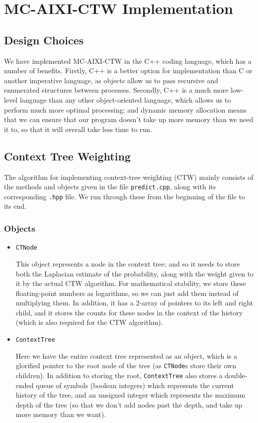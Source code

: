 \documentclass[pdftex,twoside,a4paper]{report}
\begin{document}
\chapter{MC-AIXI-CTW Implementation}
\section{Design Choices}

We have implemented MC-AIXI-CTW in the C++ coding language, which has a number of benefits. Firstly, C++ is a better option for implementation than C or another imperative language, as objects allow us to pass recursive and enumerated structures between processes. Secondly, C++ is a much more low-level language than any other object-oriented language, which allows us to perform much more optimal processing; and dynamic memory allocation means that we can ensure that our program doesn't take up more memory than we need it to, so that it will overall take less time to run.

\section{Context Tree Weighting}
The algorithm for implementing context-tree weighting (CTW) mainly consists of the methods and objects given in the file \texttt{predict.cpp}, along with its corresponding \texttt{.hpp} file. We run through these from the beginning of the file to its end.  

\subsection{Objects}
\begin{itemize}
\item{\texttt{CTNode}

This object represents a node in the context tree; and so it needs to store both the Laplacian estimate of the probability, along with the weight given to it by the actual CTW algorithm. For mathematical stability, we store these floating-point numbers as logarithms, so we can just add them instead of multiplying them. In addition, it has a 2-array of pointers to its left and right child, and it stores the counts for these nodes in the context of the history (which is also required for the CTW algorithm).
  }
\item{\texttt{ContextTree}

Here we have the entire context tree represented as an object, which is a glorified pointer to the root node of the tree (as \texttt{CTNode}s store their own children). In addition to storing the root, \texttt{ContextTree} also stores a double-ended queue of symbols (boolean integers) which represents the current history of the tree, and an unsigned integer which represents the maximum depth of the tree (so that we don't add nodes past the depth, and take up more memory than we want).
  }
\end{itemize}
\end{document}
